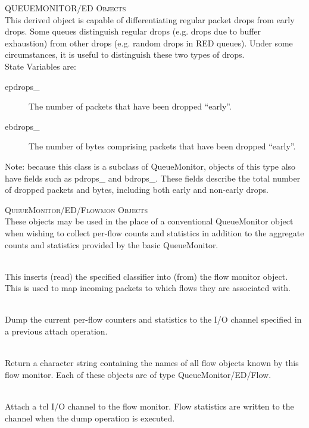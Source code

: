 \textsc{QUEUEMONITOR/ED Objects}\\
This derived object is capable of differentiating regular packet drops
from early drops. Some queues distinguish regular drops (e.g. drops due to
buffer exhaustion) from other drops (e.g. random drops in RED queues).
Under some circumstances, it is useful to distinguish these two types of
drops. 
\\
State Variables are:
\begin{description}
\item[epdrops\_] The number of packets that have been dropped ``early''. 

\item[ebdrops\_] The number of bytes comprising packets that have been
dropped ``early''. 
\end{description}

Note: because this class is a subclass of QueueMonitor, objects of this
type also have fields such as pdrops\_ and bdrops\_. These fields describe
the total number of dropped packets and bytes, including both early and
non-early drops. 


\textsc{QueueMonitor/ED/Flowmon Objects}\\
These objects may be used in the place of a conventional QueueMonitor
object when wishing to collect per-flow counts and statistics in addition
to the aggregate counts and statistics provided by the basic QueueMonitor. 

\\
This inserts (read) the specified classifier into (from) the flow monitor
object. This is used to map incoming packets to which flows they are
associated with. 

\\
Dump the current per-flow counters and statistics to the I/O channel
specified in a previous attach operation. 

\\
Return a character string containing the names of all flow objects known
by this flow monitor. Each of these objects are of type
QueueMonitor/ED/Flow. 

\\
Attach a tcl I/O channel to the flow monitor. Flow statistics are written
to the channel when the dump operation is executed. 

